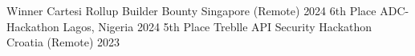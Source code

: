 \begin{cvhonors}
    \cvhonor
    {Winner} %
    {Cartesi Rollup Builder Bounty} %
    {Singapore (Remote) } %
    {2024} %
    \cvhonor
    {6th Place} %
    {ADC-Hackathon} %
    {Lagos, Nigeria} %
    {2024} %
    \cvhonor
    {5th Place} %
    {Treblle API Security Hackathon} %
    {Croatia (Remote)} %
    {2023} %

\end{cvhonors}